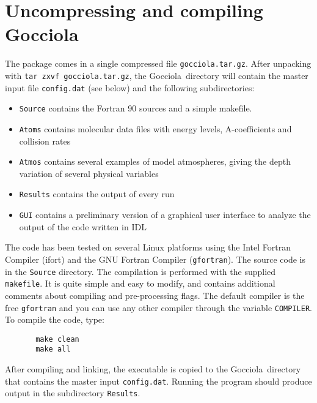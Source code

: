 \documentclass[12pt]{article}
\def\G{Gocciola}
\begin{document}
\section{Uncompressing and compiling \G}

The package comes in a single compressed file \texttt{gocciola.tar.gz}. After
unpacking with \texttt{tar zxvf gocciola.tar.gz}, the \G\ directory
will contain the master input file \texttt{config.dat} (see below) and the
following subdirectories:

\begin{itemize}
\item
{\tt Source} contains the Fortran 90 sources and a simple makefile.
\item
{\tt Atoms} contains molecular data files with energy levels,
A-coefficients and collision rates
\item
{\tt Atmos} contains several examples of model atmospheres, giving
the depth variation of several physical variables
\item
{\tt Results} contains the output of every run
\item
{\tt GUI} contains a preliminary version of a graphical user interface
to analyze the output of the code written in IDL
\end{itemize}

The code has been tested on several Linux platforms using the Intel Fortran
Compiler (ifort) and the GNU Fortran Compiler (\texttt{gfortran}). The
source code is in the \texttt{Source} directory. The compilation is performed
with the supplied \texttt{makefile}. It is quite simple and easy to modify, and
contains additional comments about compiling and pre-processing flags. The
default compiler is the free \texttt{gfortran} and you can use any other
compiler through the variable \texttt{COMPILER}. To compile the code, type:

\begin{footnotesize} \begin{verbatim}
       make clean
       make all
\end{verbatim} \end{footnotesize}
After compiling and linking, the executable is copied to the \G\
directory that contains the master input \texttt{config.dat}. Running the
program should produce output in the subdirectory {\tt Results}.


\end{document}
